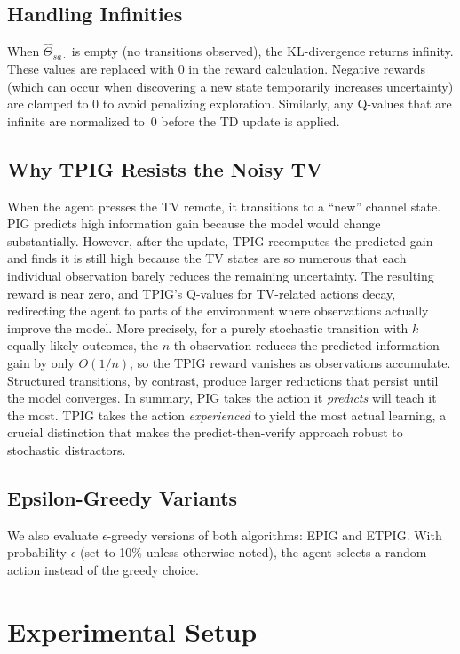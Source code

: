 \documentclass[letterpaper]{article}
\begin{document}
\subsection{Handling Infinities}

When $\hat{\Theta}_{sa\cdot}$ is empty (no transitions observed),
the KL-divergence returns infinity.  These values are replaced with 0
in the reward calculation.  Negative rewards (which can occur when
discovering a new state temporarily increases uncertainty) are clamped
to 0 to avoid penalizing exploration.  Similarly, any Q-values that
are infinite are normalized to~0 before the TD update is applied.

\subsection{Why TPIG Resists the Noisy TV}

When the agent presses the TV remote, it transitions to a ``new''
channel state.  PIG predicts high information gain because the model
would change substantially.  However, after the update, TPIG
recomputes the predicted gain and finds it is still high because the TV
states are so numerous that each individual observation barely reduces
the remaining uncertainty.  The resulting reward is near zero,
and TPIG's Q-values for TV-related actions decay, redirecting the
agent to parts of the environment where observations actually improve
the model.  More precisely, for a purely stochastic transition with
$k$ equally likely outcomes, the $n$-th observation reduces the
predicted information gain by only $O(1/n)$, so the TPIG reward
vanishes as observations accumulate.  Structured transitions, by
contrast, produce larger reductions that persist until the model
converges.  In summary, PIG takes the action it \emph{predicts} will
teach it the most.  TPIG takes the action \emph{experienced} to yield
the most actual learning, a crucial distinction that makes the
predict-then-verify approach robust to stochastic distractors.

\subsection{Epsilon-Greedy Variants}

We also evaluate $\epsilon$-greedy versions of both algorithms:
EPIG and ETPIG.  With probability $\epsilon$ (set to 10\% unless
otherwise noted), the agent selects a random action instead of the
greedy choice.

\section{Experimental Setup}
\end{document}
